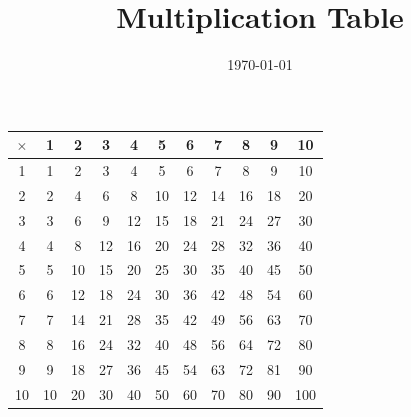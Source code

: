 \documentclass{article}
\title{Multiplication Table}
\date{\today}
\begin{document}
\maketitle

\begin{center}
\begin{tabular}{|c|c|c|c|c|c|c|c|c|c|c|}
\hline
$\times$ & 1 & 2 & 3 & 4 & 5 & 6 & 7 & 8 & 9 & 10 \\
\hline
1 & 1 & 2 & 3 & 4 & 5 & 6 & 7 & 8 & 9 & 10 \\
\hline
2 & 2 & 4 & 6 & 8 & 10 & 12 & 14 & 16 & 18 & 20 \\
\hline
3 & 3 & 6 & 9 & 12 & 15 & 18 & 21 & 24 & 27 & 30 \\
\hline
4 & 4 & 8 & 12 & 16 & 20 & 24 & 28 & 32 & 36 & 40 \\
\hline
5 & 5 & 10 & 15 & 20 & 25 & 30 & 35 & 40 & 45 & 50 \\
\hline
6 & 6 & 12 & 18 & 24 & 30 & 36 & 42 & 48 & 54 & 60 \\
\hline
7 & 7 & 14 & 21 & 28 & 35 & 42 & 49 & 56 & 63 & 70 \\
\hline
8 & 8 & 16 & 24 & 32 & 40 & 48 & 56 & 64 & 72 & 80 \\
\hline
9 & 9 & 18 & 27 & 36 & 45 & 54 & 63 & 72 & 81 & 90 \\
\hline
10 & 10 & 20 & 30 & 40 & 50 & 60 & 70 & 80 & 90 & 100 \\
\hline
\end{tabular}
\end{center}
\end{document}
